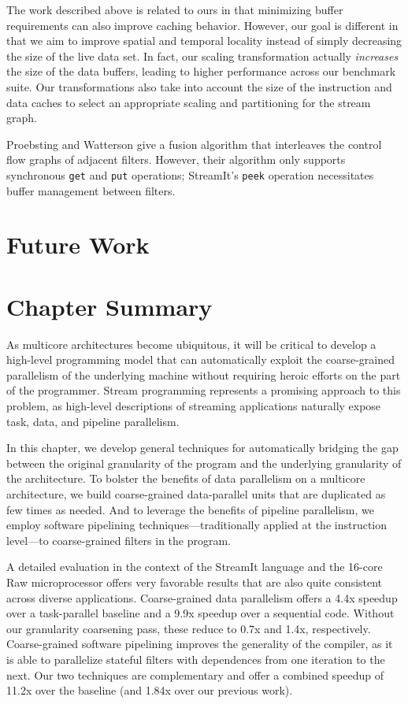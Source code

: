 The work described above is related to ours in that minimizing buffer
requirements can also improve caching behavior.  However, our goal is
different in that we aim to improve spatial and temporal locality
instead of simply decreasing the size of the live data set.  In fact,
our scaling transformation actually {\it increases} the size of the
data buffers, leading to higher performance across our benchmark
suite.  Our transformations also take into account the size of the
instruction and data caches to select an appropriate scaling and
partitioning for the stream graph.

Proebsting and Watterson \cite{pro96} give a fusion algorithm that
interleaves the control flow graphs of adjacent filters.  However,
their algorithm only supports synchronous {\tt get} and {\tt put}
operations; StreamIt's {\tt peek} operation necessitates buffer
management between filters.

\section{Future Work}

\section{Chapter Summary}


As multicore architectures become ubiquitous, it will be critical to
develop a high-level programming model that can automatically exploit
the coarse-grained parallelism of the underlying machine without
requiring heroic efforts on the part of the programmer.  Stream
programming represents a promising approach to this problem, as
high-level descriptions of streaming applications naturally expose
task, data, and pipeline parallelism.  

In this chapter, we develop general techniques for automatically
bridging the gap between the original granularity of the program and
the underlying granularity of the architecture.  To bolster the
benefits of data parallelism on a multicore architecture, we build
coarse-grained data-parallel units that are duplicated as few times as
needed.  And to leverage the benefits of pipeline parallelism, we
employ software pipelining techniques---traditionally applied at the
instruction level---to coarse-grained filters in the program.

A detailed evaluation in the context of the StreamIt language and the
16-core Raw microprocessor offers very favorable results that are also
quite consistent across diverse applications.  Coarse-grained data
parallelism offers a 4.4x speedup over a task-parallel baseline and a
9.9x speedup over a sequential code.  Without our granularity
coarsening pass, these reduce to 0.7x and 1.4x, respectively.
Coarse-grained software pipelining improves the generality of the
compiler, as it is able to parallelize stateful filters with
dependences from one iteration to the next.  Our two techniques are
complementary and offer a combined speedup of 11.2x over the baseline
(and 1.84x over our previous work).

